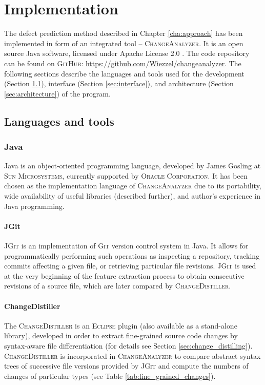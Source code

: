 \documentclass{pracamgr}
\begin{document}
\chapter{Implementation}
\label{cha:implementation}
The defect prediction method described in Chapter \ref{cha:approach} has been implemented in form of an integrated tool -- \textsc{ChangeAnalyzer}. It is an open source Java software, licensed under Apache License 2.0 \cite{apache}. The code repository can be found on \textsc{GitHub}: \url{https://github.com/Wiezzel/changeanalyzer}. The following sections describe the languages and tools used for the development (Section \ref{sec:languagess}), interface (Section \ref{sec:interface}), and architecture (Section \ref{sec:architecture}) of the program.

\section{Languages and tools}
\label{sec:languagess}

\subsection{Java} 

Java \cite{java} is an object-oriented programming language, developed by James Gosling at \textsc{Sun Microsystems}, currently supported by \textsc{Oracle Corporation}. It has been chosen as the implementation language of \textsc{ChangeAnalyzer} due to its portability, wide availability of useful libraries (described further), and author's experience in Java programming.

\subsubsection*{JGit}
\textsc{JGit} \cite{jgit} is an implementation of \textsc{Git} \cite{git} version control system in Java. It allows for programmatically performing such operations as inspecting a repository, tracking commits affecting a given file, or retrieving particular file revisions. \textsc{JGit} is used at the very beginning of the feature extraction process to obtain consecutive revisions of a source file, which are later compared by \textsc{ChangeDistiller}.

\subsubsection*{ChangeDistiller}
The \textsc{ChangeDistiller} \cite{change_distilling} is an \textsc{Eclipse} plugin (also available as a stand-alone library), developed in order to extract fine-grained source code changes by syntax-aware file differentiation (for details see Section \ref{sec:change_distilling}). \textsc{ChangeDistiller} is incorporated in \textsc{ChangeAnalyzer} to compare abstract syntax trees of successive file versions provided by \textsc{JGit} and compute the numbers of changes of particular types (see Table \ref{tab:fine_grained_changes}).
\end{document}
